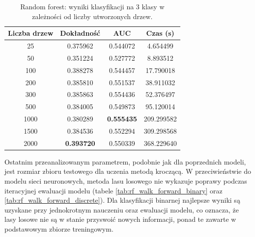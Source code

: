 \documentclass[a4paper, twoside, 11pt, openright]{article}
\begin{document}
\begin{table}[H]
    \centering
    \begin{tabular}{|c|c|c|c|}
    \hline
        \textbf{Liczba drzew} & \textbf{Dokładność} & \textbf{AUC} & \textbf{Czas (s)} \\ \hline
25         &  0.375962 &  0.544072 &    4.654499 \\ \hline
50         &  0.351224 &  0.527772 &    8.893512 \\ \hline
100       &  0.388278 &  0.544457 &   17.790018 \\ \hline
200        &  0.385810 &  0.551537 &   38.911032 \\ \hline
300        &  0.385863 &  0.554436 &   52.376497 \\ \hline
500        &  0.384005 &  0.549873 &   95.120014 \\ \hline
1000       &  0.380289 &  \textbf{0.555435} &  209.299582 \\ \hline
1500       &  0.384536 &  0.552294 &  309.298568 \\ \hline
2000      &  \textbf{0.393720} &  0.550339 &  368.229640 \\ \hline
    \end{tabular}
    \caption{Random forest: wyniki klasyfikacji na 3 klasy w zależności od liczby utworzonych drzew.}
    \label{tab:rf_estimators_discrete}
\end{table}

Ostatnim przeanalizowanym parametrem, podobnie jak dla poprzednich modeli, jest rozmiar zbioru testowego dla uczenia metodą kroczącą. W przeciwieństwie do modelu sieci neuronowych, metoda lasu losowego nie wykazuje poprawy podczas iteracyjnej ewaluacji modelu (tabele \ref{tab:rf_walk_forward_binary} oraz \ref{tab:rf_walk_forward_discrete}). Dla klasyfikacji binarnej najlepsze wyniki są uzyskane przy jednokrotnym nauczeniu oraz ewaluacji modelu, co oznacza, że lasy losowe nie są w stanie przyswoić nowych informacji, ponad te zawarte w podstawowym zbiorze treningowym.
\end{document}
